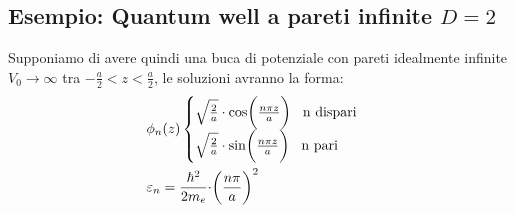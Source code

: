 \subsection{Esempio: Quantum well a pareti infinite $D=2$}
Supponiamo di avere quindi una buca di potenziale con pareti idealmente infinite $V_0 \to \infty$ tra $-\frac{a}{2}<z<\frac{a}{2}$, le soluzioni avranno la forma:
\begin{equation}
    \begin{split}
        & \phi_n(z) \begin{cases}
            \sqrt{\frac{2}{a}}\cdot \cos\biggr(\frac{n\pi z}{a}\biggr) \hspace{0.3cm} \text{n dispari}\\
            \sqrt{\frac{2}{a}}\cdot \sin\biggr(\frac{n\pi z}{a}\biggr) \hspace{0.3cm} \text{n pari}
        \end{cases}\\
        &\varepsilon_n = \frac{\hbar^2}{2m_e}\cdot \biggr(\frac{n\pi}{a}\biggr)^2\\
    \end{split}
\end{equation}

